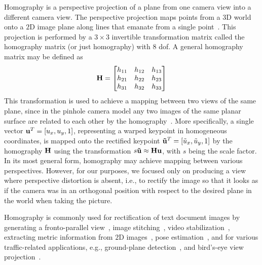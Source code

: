 Homography is a perspective projection of a plane from one camera view into a different camera view. The perspective projection maps points from a $3$D world onto a $2$D image plane along lines that emanate from a single point~\cite{geetha2013automatic, bousaid2020perspective}. This projection is performed by a $3 \times 3$ invertible transformation matrix called the homography matrix (or just homography) with $8$ \gls{dof}. A general homography matrix may be defined as
\begin{equation}
    \label{eq:HomographyMatrix}
    \mathbf{H} =
    \begin{bmatrix}
        h_{11} & h_{12} & h_{13}\\
        h_{21} & h_{22} & h_{23}\\
        h_{31} & h_{32} & h_{33}
    \end{bmatrix}
\end{equation}
This transformation is used to achieve a mapping between two views of the same plane, since in the pinhole camera model any two images of the same planar surface are related to each other by the homography~\cite{hartley2003multiple, hartley1997defense}. More specifically, a single vector ${\mathbf{u}}^T = \left[ {u_x, u_y, 1} \right]$, representing a warped keypoint in homogeneous coordinates, is mapped onto the rectified keypoint  ${\mathbf{\tilde{u}}}^T = \left[ {\tilde{u}_x, \tilde{u}_y, 1} \right]$ by the homography $\mathbf{H}$ using the transformation $s \mathbf{\tilde{u}} \approx \mathbf{H} \mathbf{u}$, with $s$ being the scale factor. In its most general form, homography may achieve mapping between various perspectives. However, for our purposes, we focused only on producing a view where perspective distortion is absent, i.e., to rectify the image so that it looks as if the camera was in an orthogonal position with respect to the desired plane in the world when taking the picture.

Homography is commonly used for rectification of text document images by generating a fronto-parallel view~\cite{lu2005perspective, miao2006perspective}, image stitching~\cite{adel2014image, gao2011constructing}, video stabilization~\cite{liu2015smooth}, extracting metric information from $2$D images~\cite{zhang2000flexible}, pose estimation~\cite{mariyanayagam2018poseestim}, and for various traffic-related applications, e.g., ground-plane detection~\cite{arrospide2010homography}, and bird's-eye view projection~\cite{luo2010low}.

